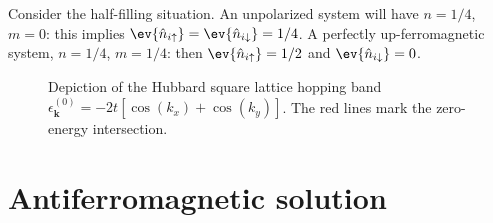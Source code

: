 Consider the half-filling situation. An unpolarized system will have $n=1/4$, $m=0$: this implies $\ev{\hat n_{i\uparrow}} = \ev{\hat n_{i\downarrow}} = 1/4$. A perfectly up-ferromagnetic system, $n=1/4$, $m=1/4$: then $\ev{\hat n_{i\uparrow}} = 1/2$ and $\ev{\hat n_{i\downarrow}} = 0$. \todo

\begin{figure}
	\centering
	
	\caption{Depiction of the Hubbard square lattice hopping band $\epsilon_{\mathbf{k}}^{(0)} = -2t[\cos(k_x) + \cos(k_y)]$. The red lines mark the zero-energy intersection.}
	\label{appfig:ferromagnetic-3d-band}
\end{figure}

\section{Antiferromagnetic solution}

